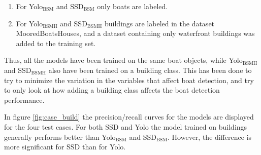 \vspace{1mm}

\begin{enumerate}
    \item For Yolo$_{\text{BSM}}$ and SSD$_{\text{BSM}}$ only boats are labeled.
    \item For Yolo$_{\text{BSMH}}$ and SSD$_{\text{BSMH}}$ buildings are labeled in the dataset MooredBoatsHouses, and a dataset containing only waterfront buildings was added to the training set.
\end{enumerate}

\vspace{1mm}
\noindent
Thus, all the models have been trained on the same boat objects, while Yolo$_{\text{BSMH}}$ and SSD$_{\text{BSMH}}$ also have been trained on a building class. This has been done to try to minimize the variation in the variables that affect boat detection, and try to only look at how adding a building class affects the boat detection performance.

\vspace{3mm}
\noindent
In figure \ref{fig:case_build} the precision/recall curves for the models are displayed for the four test cases. For both SSD and Yolo the model trained on buildings generally performs better than Yolo$_{\text{BSM}}$ and SSD$_{\text{BSM}}$. However, the difference is more significant for SSD than for Yolo. 

